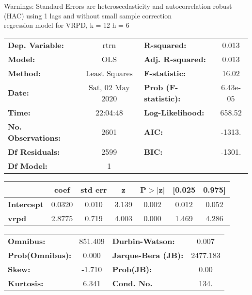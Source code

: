 Warnings: \newline
 [1] Standard Errors are heteroscedasticity and autocorrelation robust (HAC) using 1 lags and without small sample correction\\ 

regression model for VRPD, k = 12 h = 6\begin{center}
\begin{tabular}{lclc}
\toprule
\textbf{Dep. Variable:}    &       rtrn       & \textbf{  R-squared:         } &     0.013   \\
\textbf{Model:}            &       OLS        & \textbf{  Adj. R-squared:    } &     0.013   \\
\textbf{Method:}           &  Least Squares   & \textbf{  F-statistic:       } &     16.02   \\
\textbf{Date:}             & Sat, 02 May 2020 & \textbf{  Prob (F-statistic):} &  6.43e-05   \\
\textbf{Time:}             &     22:04:48     & \textbf{  Log-Likelihood:    } &    658.52   \\
\textbf{No. Observations:} &        2601      & \textbf{  AIC:               } &    -1313.   \\
\textbf{Df Residuals:}     &        2599      & \textbf{  BIC:               } &    -1301.   \\
\textbf{Df Model:}         &           1      & \textbf{                     } &             \\
\bottomrule
\end{tabular}
\begin{tabular}{lcccccc}
                   & \textbf{coef} & \textbf{std err} & \textbf{z} & \textbf{P$> |$z$|$} & \textbf{[0.025} & \textbf{0.975]}  \\
\midrule
\textbf{Intercept} &       0.0320  &        0.010     &     3.139  &         0.002        &        0.012    &        0.052     \\
\textbf{vrpd}      &       2.8775  &        0.719     &     4.003  &         0.000        &        1.469    &        4.286     \\
\bottomrule
\end{tabular}
\begin{tabular}{lclc}
\textbf{Omnibus:}       & 851.409 & \textbf{  Durbin-Watson:     } &    0.007  \\
\textbf{Prob(Omnibus):} &   0.000 & \textbf{  Jarque-Bera (JB):  } & 2477.183  \\
\textbf{Skew:}          &  -1.710 & \textbf{  Prob(JB):          } &     0.00  \\
\textbf{Kurtosis:}      &   6.341 & \textbf{  Cond. No.          } &     134.  \\
\bottomrule
\end{tabular}
\end{center}

